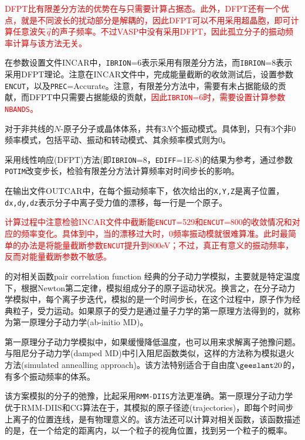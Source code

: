 \textcolor{red}{\textrm{DFPT}比有限差分方法的优势在与只需要计算占据态。此外，\textrm{DFPT}还有一个优点，就是不同波长的扰动部分是解耦的，因此\textrm{DFPT}可以不用采用超晶胞，即可计算任意波矢$\vec q$的声子频率。不过\textrm{VASP}中没有采用\textrm{DFPT}，因此孤立分子的振动频率计算与该方法无关。}

在参数设置文件\textrm{INCAR}中，\texttt{IBRION}=6表示采用有限差分方法，而\texttt{IBRION}=8表示采用\textrm{DFPT}理论。注意在\textrm{INCAR}文件中，完成能量截断的收敛测试后，设置参数\texttt{ENCUT}，以及\texttt{PREC}=\textrm{Accurate}。注意，有限差分方法中，需要有未占据能级的贡献，而\textrm{DFPT}中只需要占据能级的贡献，\textcolor{red}{因此\texttt{IBRION}=6时，需要设置计算参数\texttt{NBANDS}。}

对于非共线的$N$-原子分子或晶体体系，共有$3N$个振动模式。具体到，只有3个非0频率模式，包括平动、振动和转动模式、其余频率模式则为0。

采用线性响应\textrm{(DFPT)}方法(即\texttt{IBRION}=8，\texttt{EDIFF}=\textrm{1E-8})的结果为参考，通过参数\texttt{POTIM}改变步长，检验有限差分方法计算频率对时间步长的影响。

在输出文件\textrm{OUTCAR}中，在每个振动频率下，依次给出的\texttt{X,Y,Z}是离子位置，\texttt{dx,dy,dz}表示分子中离子受力值的漂移，每一行是一个原子。

\textcolor{red}{计算过程中注意检验\textrm{INCAR}文件中截断能\texttt{ENCUT}=529和\texttt{ENCUT}=800的收敛情况和对应的频率变化。具体到中，当的漂移过大时，0频率振动模就很难算准。此时最简单的办法是将能量截断参数\texttt{ENCUT}提升到800\textrm{eV}；不过，真正有意义的振动频率，反而对能量截断参数不敏感。}

的对相关函数\textrm{pair correlation function}
经典的分子动力学模拟，主要就是特定温度下，根据\textrm{Newton}第二定律，模拟组成分子的原子运动状况。换言之，在分子动力学模拟中，每个离子步迭代，模拟的是一个时间步长，在这个过程中，原子作为经典粒子，受力运动。如果原子的受力是通过量子力学的第一原理方法得到的，就称为第一原理分子动力学\textrm{(ab-initio MD)}。

第一原理分子动力学模拟中，如果缓慢降低温度，也可以用来求解离子弛豫问题。与阻尼分子动力学\textrm{(damped MD)}中引入阻尼函数类似，这样的方法称为模拟退火方法\textrm{(simulated annealling approach)}。该方法特别适合于自由度$\geeslant20$的，有多个振动频率的体系。

该方案模拟的分子的弛豫，比起采用\texttt{RMM-DIIS}方法更准确。第一原理分子动力学优于\textrm{RMM-DIIS}和\textrm{CG}算法在于，其模拟的原子径迹\textrm{(trajectories)}，即每个时间步上离子的位置连线，是有物理意义的。该方法还可以计算对相关函数，该函数描述的是，在一个给定的距离内，以一个粒子的视角位置，找到另一个粒子的概率。

